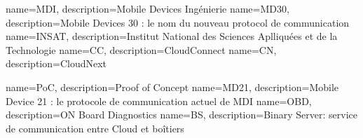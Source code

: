  {
	name=MDI,
	description={Mobile Devices Ingénierie}
}
 {
	name=MD30,
	description={Mobile Devices 30 : le nom du nouveau protocol de communication }
}
 {
	name=INSAT,
	description={Institut National des Sciences Aplliquées et de la Technologie}
}
 {
	name=CC,
	description={CloudConnect}
}
 {
	name=CN,
	description={CloudNext}
}

 {
	name=PoC,
	description={Proof of Concept}
}
 {
	name=MD21,
	description={Mobile Device 21 : le protocole de communication actuel de MDI}
}
 {
	name=OBD,
	description={ON Board Diagnostics}
}
 {
	name=BS,
	description={Binary Server: service de communication entre Cloud et boîtiers}
}
